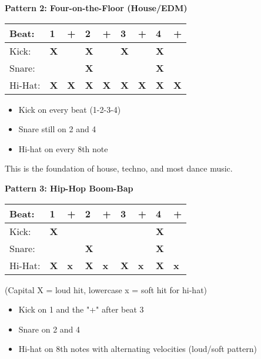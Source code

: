 \documentclass[11pt,letterpaper]{article}
\begin{document}
\vspace{0.5cm}

\textbf{Pattern 2: Four-on-the-Floor (House/EDM)}

\begin{center}
\begin{tabular}{l l l l l l l l l}
Beat: & 1 & + & 2 & + & 3 & + & 4 & + \\
\hline
Kick: & \textbf{X} & & \textbf{X} & & \textbf{X} & & \textbf{X} & \\
Snare: & & & \textbf{X} & & & & \textbf{X} & \\
Hi-Hat: & \textbf{X} & \textbf{X} & \textbf{X} & \textbf{X} & \textbf{X} & \textbf{X} & \textbf{X} & \textbf{X} \\
\end{tabular}
\end{center}

\begin{itemize}[leftmargin=*]
\item Kick on every beat (1-2-3-4)
\item Snare still on 2 and 4
\item Hi-hat on every 8th note
\end{itemize}

This is the foundation of house, techno, and most dance music.

\vspace{0.5cm}

\textbf{Pattern 3: Hip-Hop Boom-Bap}

\begin{center}
\begin{tabular}{l l l l l l l l l}
Beat: & 1 & + & 2 & + & 3 & + & 4 & + \\
\hline
Kick: & \textbf{X} & & & & & & \textbf{X} & \\
Snare: & & & \textbf{X} & & & & \textbf{X} & \\
Hi-Hat: & \textbf{X} & \textbf{x} & \textbf{X} & \textbf{x} & \textbf{X} & \textbf{x} & \textbf{X} & \textbf{x} \\
\end{tabular}
\end{center}

(Capital X = loud hit, lowercase x = soft hit for hi-hat)

\begin{itemize}[leftmargin=*]
\item Kick on 1 and the "+" after beat 3
\item Snare on 2 and 4
\item Hi-hat on 8th notes with alternating velocities (loud/soft pattern)
\end{itemize}
\end{document}
